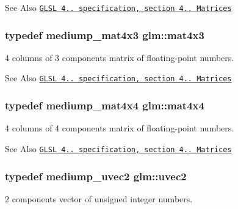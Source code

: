 \begin{DoxySeeAlso}{See Also}
\href{http://www.opengl.org/registry/doc/GLSLangSpec.4.20.8.pdf}{\tt G\-L\-S\-L 4.. specification, section 4.. Matrices} 
\end{DoxySeeAlso}
\hypertarget{group__core__types_ga605b649496ad53379e8ac6d7a4534667}{
\subsubsection[{mat4x3}]{\setlength{\rightskip}{0pt plus 5cm}typedef mediump\-\_\-mat4x3 {\bf glm\-::mat4x3}}}\label{group__core__types_ga605b649496ad53379e8ac6d7a4534667}


4 columns of 3 components matrix of floating-\/point numbers. 

\begin{DoxySeeAlso}{See Also}
\href{http://www.opengl.org/registry/doc/GLSLangSpec.4.20.8.pdf}{\tt G\-L\-S\-L 4.. specification, section 4.. Matrices} 
\end{DoxySeeAlso}
\hypertarget{group__core__types_gafe3341c717b9f9725019a10fd1dcf9c1}{
\subsubsection[{mat4x4}]{\setlength{\rightskip}{0pt plus 5cm}typedef mediump\-\_\-mat4x4 {\bf glm\-::mat4x4}}}\label{group__core__types_gafe3341c717b9f9725019a10fd1dcf9c1}


4 columns of 4 components matrix of floating-\/point numbers. 

\begin{DoxySeeAlso}{See Also}
\href{http://www.opengl.org/registry/doc/GLSLangSpec.4.20.8.pdf}{\tt G\-L\-S\-L 4.. specification, section 4.. Matrices} 
\end{DoxySeeAlso}
\hypertarget{group__core__types_gad0643cb47b927024ccf4979b0e9a903d}{
\subsubsection[{uvec2}]{\setlength{\rightskip}{0pt plus 5cm}typedef mediump\-\_\-uvec2 {\bf glm\-::uvec2}}}\label{group__core__types_gad0643cb47b927024ccf4979b0e9a903d}


2 components vector of unsigned integer numbers. 

